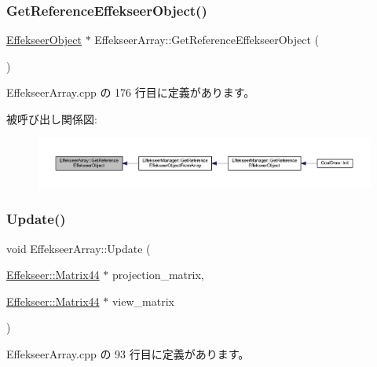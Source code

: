 \subsubsection{\texorpdfstring{Get\+Reference\+Effekseer\+Object()}{GetReferenceEffekseerObject()}}
{\footnotesize\ttfamily \mbox{\hyperlink{class_effekseer_object}{Effekseer\+Object}} $\ast$ Effekseer\+Array\+::\+Get\+Reference\+Effekseer\+Object (\begin{DoxyParamCaption}{ }\end{DoxyParamCaption})}



 Effekseer\+Array.\+cpp の 176 行目に定義があります。

被呼び出し関係図\+:\nopagebreak
\begin{figure}[H]
\begin{center}
\leavevmode
\includegraphics[width=350pt]{class_effekseer_array_a0bbf7d610ef2219e3699d3f26182af03_icgraph}
\end{center}
\end{figure}
\mbox{\label{class_effekseer_array_a41fcca7eb106c1c83851eca1284800f4}} 
\subsubsection{\texorpdfstring{Update()}{Update()}}
{\footnotesize\ttfamily void Effekseer\+Array\+::\+Update (\begin{DoxyParamCaption}\item[{\mbox{\hyperlink{struct_effekseer_1_1_matrix44}{Effekseer\+::\+Matrix44}} $\ast$}]{projection\+\_\+matrix,  }\item[{\mbox{\hyperlink{struct_effekseer_1_1_matrix44}{Effekseer\+::\+Matrix44}} $\ast$}]{view\+\_\+matrix }\end{DoxyParamCaption})}



 Effekseer\+Array.\+cpp の 93 行目に定義があります。

